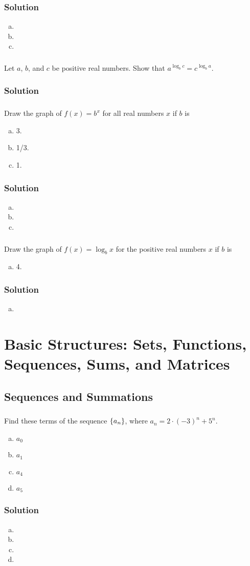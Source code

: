 \documentclass[11pt,a4paper,multicol]{article}
\newcommand{\chapter}[2]{%
\setcounter{section}{#1}%
\addtocounter{section}{-1}%
\section{#2}%
}
\newcommand{\subchapter}[2]{%
\setcounter{subsection}{#1}%
\addtocounter{subsection}{-1}%
\subsection{#2}%
}
\newcommand{\problem}[1]{%
\setcounter{subsubsection}{#1}%
\addtocounter{subsubsection}{-1}%
\subsubsection{\hfill}%
}
\newenvironment{subproblem}
	{\begin{enumerate}[a)]}
	{\end{enumerate}}
\newcommand{\solution}{%
\subsubsection*{Solution}%
}
\DeclarePairedDelimiter{\set}
	{\lbrace}
	{\rbrace}
\begin{document}
		\solution
			\begin{subproblem}
				\item
				\item
				\item
			\end{subproblem}

		\problem{4}
			Let $a$, $b$, and $c$ be positive real numbers.
			Show that $a^{\log_b c} = c^{\log_b a}$.
		\solution
			

		\problem{5}
			Draw the graph of $f(x) = b^x$ for all real numbers $x$ if $b$ is
			\begin{subproblem}
				\item 3.
				\item 1/3.
				\item 1.
			\end{subproblem}
		\solution
			\begin{subproblem}
				\item
				\item
				\item
			\end{subproblem}
			
		\problem{6}
			Draw the graph of $f(x) = \log_b x$ for the positive real numbers $x$ if $b$ is
			\begin{subproblem}
				\item 4.
			\end{subproblem}
		\solution
			\begin{subproblem}
				\item
			\end{subproblem}

\chapter{2}{Basic Structures: Sets, Functions, Sequences, Sums, and Matrices}
	\subchapter{4}{Sequences and Summations}

		\problem{1}
			Find these terms of the sequence $\set{a_n}$, where $a_n = 2 \cdot (-3)^n + 5^n$.
			\begin{subproblem}
				\item $a_0$
				\item $a_1$
				\item $a_4$
				\item $a_5$
			\end{subproblem}
		\solution
			\begin{subproblem}
				\item
				\item
				\item
				\item
			\end{subproblem}
\end{document}
